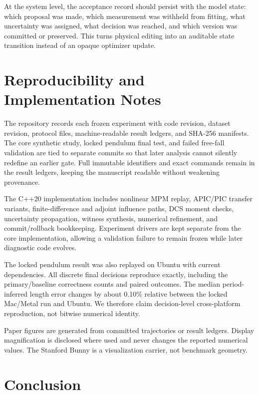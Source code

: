 \documentclass[acmtog]{acmart}
\begin{document}
At the system level, the acceptance record should persist with the model state: which proposal was made, which measurement was withheld from fitting, what uncertainty was assigned, what decision was reached, and which version was committed or preserved. This turns physical editing into an auditable state transition instead of an opaque optimizer update.

\section{Reproducibility and Implementation Notes}\label{reproducibility-and-implementation-notes}

The repository records each frozen experiment with code revision, dataset revision, protocol files, machine-readable result ledgers, and SHA-256 manifests. The core synthetic study, locked pendulum final test, and failed free-fall validation are tied to separate commits so that later analysis cannot silently redefine an earlier gate. Full immutable identifiers and exact commands remain in the result ledgers, keeping the manuscript readable without weakening provenance.

The C++20 implementation includes nonlinear MPM replay, APIC/PIC transfer variants, finite-difference and adjoint influence paths, DCS moment checks, uncertainty propagation, witness synthesis, numerical refinement, and commit/rollback bookkeeping. Experiment drivers are kept separate from the core implementation, allowing a validation failure to remain frozen while later diagnostic code evolves.

The locked pendulum result was also replayed on Ubuntu with current dependencies. All discrete final decisions reproduce exactly, including the primary/baseline correctness counts and paired outcomes. The median period-inferred length error changes by about 0.10\% relative between the locked Mac/Metal run and Ubuntu. We therefore claim decision-level cross-platform reproduction, not bitwise numerical identity.

Paper figures are generated from committed trajectories or result ledgers. Display magnification is disclosed where used and never changes the reported numerical values. The Stanford Bunny is a visualization carrier, not benchmark geometry.

\section{Conclusion}\label{conclusion}
\end{document}
